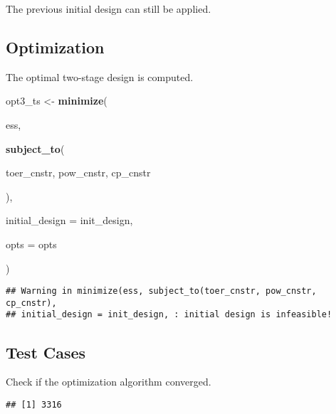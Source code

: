 \documentclass[]{book}
\newenvironment{Shaded}{\begin{snugshade}}{\end{snugshade}}
\newcommand{\DataTypeTok}[1]{\textcolor[rgb]{0.13,0.29,0.53}{#1}}
\newcommand{\KeywordTok}[1]{\textcolor[rgb]{0.13,0.29,0.53}{\textbf{#1}}}
\newcommand{\NormalTok}[1]{#1}
\newcommand{\OperatorTok}[1]{\textcolor[rgb]{0.81,0.36,0.00}{\textbf{#1}}}
\newcommand{\StringTok}[1]{\textcolor[rgb]{0.31,0.60,0.02}{#1}}
\begin{document}
The previous initial design can still be applied.

\hypertarget{optimization-2}{%
\subsection{Optimization}\label{optimization-2}}

The optimal two-stage design is computed.

\begin{Shaded}
\begin{Highlighting}[]
\NormalTok{opt3_ts <-}\StringTok{ }\KeywordTok{minimize}\NormalTok{(}
        
\NormalTok{        ess,}
        
        \KeywordTok{subject_to}\NormalTok{(}
            
\NormalTok{            toer_cnstr,}
\NormalTok{            pow_cnstr,}
\NormalTok{            cp_cnstr}
            
\NormalTok{        ),}
        
        \DataTypeTok{initial_design =}\NormalTok{ init_design,}
        
        \DataTypeTok{opts =}\NormalTok{ opts}
        
\NormalTok{)}
\end{Highlighting}
\end{Shaded}

\begin{verbatim}
## Warning in minimize(ess, subject_to(toer_cnstr, pow_cnstr, cp_cnstr),
## initial_design = init_design, : initial design is infeasible!
\end{verbatim}

\hypertarget{test-cases-2}{%
\subsection{Test Cases}\label{test-cases-2}}

Check if the optimization algorithm converged.

\begin{Shaded}
\end{Shaded}

\begin{verbatim}
## [1] 3316
\end{verbatim}
\end{document}

